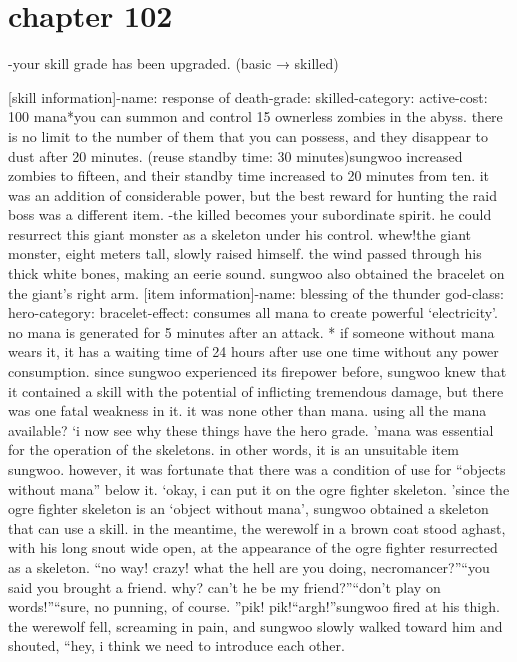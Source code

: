 \section{chapter 102}

                            -your skill grade has been upgraded.
 (basic → skilled)




[skill information]-name: response of death-grade: skilled-category: active-cost: 100 mana*you can summon and control 15 ownerless zombies in the abyss.
 there is no limit to the number of them that you can possess, and they disappear to dust after 20 minutes.
 (reuse standby time: 30 minutes)sungwoo increased zombies to fifteen, and their standby time increased to 20 minutes from ten.
 it was an addition of considerable power, but the best reward for hunting the raid boss was a different item.
-the killed becomes your subordinate spirit.
he could resurrect this giant monster as a skeleton under his control.
whew!the giant monster, eight meters tall, slowly raised himself.
 the wind passed through his thick white bones, making an eerie sound.
 sungwoo also obtained the bracelet on the giant’s right arm.
[item information]-name: blessing of the thunder god-class: hero-category: bracelet-effect: consumes all mana to create powerful ‘electricity’.
 no mana is generated for 5 minutes after an attack.
* if someone without mana wears it, it has a waiting time of 24 hours after use one time without any power consumption.
since sungwoo experienced its firepower before, sungwoo knew that it contained a skill with the potential of inflicting tremendous damage, but there was one fatal weakness in it.
it was none other than mana.
 using all the mana available?
‘i now see why these things have the hero grade.
’mana was essential for the operation of the skeletons.
 in other words, it is an unsuitable item sungwoo.
however, it was fortunate that there was a condition of use for “objects without mana” below it.
‘okay, i can put it on the ogre fighter skeleton.
’since the ogre fighter skeleton is an ‘object without mana’, sungwoo obtained a skeleton that can use a skill.
in the meantime, the werewolf in a brown coat stood aghast, with his long snout wide open, at the appearance of the ogre fighter resurrected as a skeleton.
“no way! crazy! what the hell are you doing, necromancer?”“you said you brought a friend.
 why? can’t he be my friend?”“don’t play on words!”“sure, no punning, of course.
”pik! pik!“argh!”sungwoo fired at his thigh.
 the werewolf fell, screaming in pain, and sungwoo slowly walked toward him and shouted, “hey, i think we need to introduce each other.
